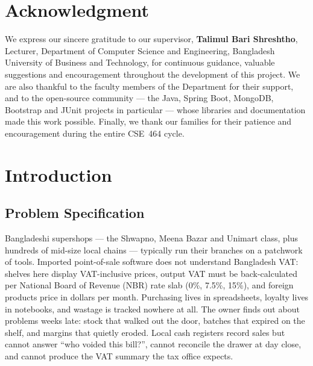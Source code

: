 \documentclass[12pt,a4paper]{report}
\begin{document}
\chapter*{Acknowledgment}
\noindent
We express our sincere gratitude to our supervisor, \textbf{Talimul Bari Shreshtho},
Lecturer, Department of Computer Science and Engineering, Bangladesh University of Business
and Technology, for continuous guidance, valuable suggestions and encouragement throughout
the development of this project. We are also thankful to the faculty members of the
Department for their support, and to the open-source community --- the Java, Spring Boot,
MongoDB, Bootstrap and JUnit projects in particular --- whose libraries and documentation
made this work possible. Finally, we thank our families for their patience and
encouragement during the entire CSE~464 cycle.

\tableofcontents
\cleardoublepage
{}
\listoffigures
\cleardoublepage
{}
\listoftables
\cleardoublepage


\chapter{Introduction}

\section{Problem Specification}
Bangladeshi supershops --- the Shwapno, Meena Bazar and Unimart class, plus hundreds of
mid-size local chains --- typically run their branches on a patchwork of tools. Imported
point-of-sale software does not understand Bangladesh VAT: shelves here display
VAT-inclusive prices, output VAT must be back-calculated per National Board of Revenue
(NBR) rate slab (0\%, 7.5\%, 15\%), and foreign products price in dollars per month.
Purchasing lives in spreadsheets, loyalty lives in notebooks, and wastage is tracked
nowhere at all. The owner finds out about problems weeks late: stock that walked out the
door, batches that expired on the shelf, and margins that quietly eroded. Local cash
registers record sales but cannot answer ``who voided this bill?'', cannot reconcile the
drawer at day close, and cannot produce the VAT summary the tax office expects.
\end{document}
